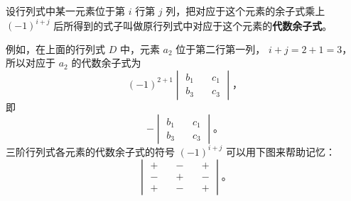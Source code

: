设行列式中某一元素位于第 $i$ 行第 $j$ 列，把对应于这个元素的余子式乘上
 $(-1)^{i+j}$ 后所得到的式子叫做原行列式中对应于这个元素的\textbf{代数余子式}。

例如，在上面的行列式 $D$ 中，元素 $a_2$ 位于第二行第一列，
$i + j = 2 + 1 = 3$， 所以对应于 $a_2$ 的代数余子式为
$$
(-1)^{2+1}\begin{vmatrix}
    b_1 \quad & c_1 \\
    b_3 \quad & c_3
\end{vmatrix} \text{，}
$$
即
$$
-\begin{vmatrix}
    b_1 \quad & c_1 \\
    b_3 \quad & c_3
\end{vmatrix} \text{。}
$$
三阶行列式各元素的代数余子式的符号 $(-1)^{i+j}$ 可以用下图来帮助记忆：
$$
\begin{vmatrix}
	+ \quad & - \quad & + \\
	- \quad & + \quad & - \\
	+ \quad & - \quad & +
\end{vmatrix} \text{。}
$$


